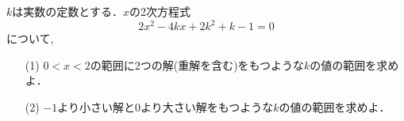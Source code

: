 \documentclass[8pt,dvipdfmx]{article}
\begin{document}
\begin{tcolorbox}[title=数学\textcircled{1} 2- 5 B ]
\(k\)は実数の定数とする．\(x\)の2次方程式
\[2x^2 -4kx +2k^2 +k -1 =0\]
について,
\begin{enumerate}
\item[(1)] $0<x<2$の範囲に2つの解(重解を含む)をもつような\(k\)の値の範囲を求めよ．
    \vspace{2mm} %
    \item[(2)]$-1$より小さい解と$0$より大さい解をもつような\(k\)の値の範囲を求めよ．
\end{enumerate}
\end{tcolorbox}



\end{document}
